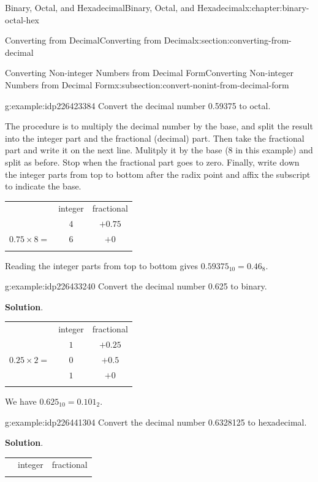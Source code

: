 \documentclass[twoside,10pt,]{book}
\newcommand{\blocktitlefont}{\relax}
\newcommand{\tabularfont}{\relax}
\numberwithin{equation}{section}
\newcommand{\hrulemedium}{\noalign{\hrule height 0.07em}}
\newcommand{\hrulethick} {\noalign{\hrule height 0.11em}}
\begin{document}
\begin{chapterptx}{Binary, Octal, and Hexadecimal}{}{Binary, Octal, and Hexadecimal}{}{}{x:chapter:binary-octal-hex}
\begin{sectionptx}{Converting from Decimal}{}{Converting from Decimal}{}{}{x:section:converting-from-decimal}
\begin{subsectionptx}{Converting Non-integer Numbers from Decimal Form}{}{Converting Non-integer Numbers from Decimal Form}{}{}{x:subsection:convert-nonint-from-decimal-form}
\begin{example}{}{g:example:idp226423384}%
Convert the decimal number 0.59375 to octal.%
\par
The procedure is to multiply the decimal number by the base, and split the result into the integer part and the fractional (decimal) part.  Then take the fractional part and write it on the next line.  Mulitply it by the base (8 in this example) and split as before.  Stop when the fractional part goes to zero.  Finally, write down the integer parts from top to bottom after the radix point and affix the subscript to indicate the base. \begin{center}%
{\tabularfont%
\begin{tabular}{ccc}\hrulethick
&integer&fractional\tabularnewline\hrulemedium
\multicolumn{1}{r}{\(0.59375\times 8=\)}&\(4\)&\(+0.75\)\tabularnewline[0pt]
\multicolumn{1}{r}{\(0.75\times 8=\)}&\(6\)&\(+0\)\tabularnewline\hrulethick
\end{tabular}
}%
\end{center}%
 Reading the integer parts from top to bottom gives \(0.59375_{10}=0.46_8\).%
\end{example}
\begin{example}{}{g:example:idp226433240}%
Convert the decimal number 0.625 to binary.\par\smallskip%
\noindent\textbf{\blocktitlefont Solution}.\label{g:solution:idp226425688}{}\hypertarget{g:solution:idp226425688}{}\quad{}\begin{center}%
{\tabularfont%
\begin{tabular}{ccc}\hrulethick
&integer&fractional\tabularnewline\hrulemedium
\multicolumn{1}{r}{\(0.625\times 2=\)}&\(1\)&\(+0.25\)\tabularnewline[0pt]
\multicolumn{1}{r}{\(0.25\times 2=\)}&\(0\)&\(+0.5\)\tabularnewline\hrulethick
\multicolumn{1}{r}{\(0.5\times 2=\)}&\(1\)&\(+0\)\tabularnewline\hrulethick
\end{tabular}
}%
\end{center}%
 We have \(0.625_{10}=0.101_2\).\end{example}
\begin{example}{}{g:example:idp226441304}%
Convert the decimal number 0.6328125 to hexadecimal.\par\smallskip%
\noindent\textbf{\blocktitlefont Solution}.\label{g:solution:idp226433624}{}\hypertarget{g:solution:idp226433624}{}\quad{}\begin{center}%
{\tabularfont%
\begin{tabular}{ccc}\hrulethick
&integer&fractional\tabularnewline\hrulemedium

\end{tabular}}
\end{center}
\end{example}
\end{subsectionptx}
\end{sectionptx}
\end{chapterptx}
\end{document}
